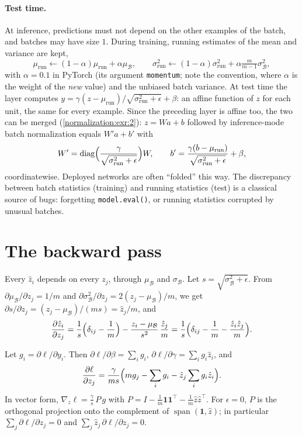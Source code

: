 \begin{notechapter}
\paragraph{Test time.} At inference, predictions must not depend on the other examples of
the batch, and batches may have size $1$. During training, running estimates of the mean and
variance are kept,
\[
  \mu_{\mathrm{run}}\gets(1 - \alpha)\mu_{\mathrm{run}} + \alpha\mu_{\mathcal B},\qquad\sigma^2_{\mathrm{run}}\gets(1 - \alpha)\sigma^2_{\mathrm{run}} + \alpha\tfrac m{m - 1}\sigma^2_{\mathcal B},
\]
with $\alpha = 0.1$ in PyTorch (its argument \texttt{momentum}; note the convention, where $\alpha$ is the
weight of the \emph{new} value) and the unbiased batch variance. At test time the layer computes
$y = \gamma(z - \mu_{\mathrm{run}})/\sqrt{\sigma^2_{\mathrm{run}} + \epsilon} + \beta$: an affine function of $z$ for each unit, the same for every
example. Since the preceding layer is affine too, the two can be merged
(\cref{normalization:exr:2}): $z = Wa + b$ followed by inference-mode batch normalization equals
$W'a + b'$ with
\[
  W' = \operatorname{diag}\Bigl(\frac\gamma{\sqrt{\sigma^2_{\mathrm{run}} + \epsilon}}\Bigr)W,\qquad b' = \frac{\gamma(b - \mu_{\mathrm{run}})}{\sqrt{\sigma^2_{\mathrm{run}} + \epsilon}} + \beta,
\]
coordinatewise. Deployed networks are often ``folded'' this way. The discrepancy between
batch statistics (training) and running statistics (test) is a classical source of bugs:
forgetting \texttt{model.eval()}, or running statistics corrupted by unusual batches.

\section{The backward pass}\label{normalization:sec:backward}

Every $\hat z_i$ depends on every $z_j$, through $\mu_{\mathcal B}$ and $\sigma_{\mathcal B}$. Let $s = \sqrt{\sigma_{\mathcal B}^2 + \epsilon}$. From $\partial\mu_{\mathcal B}/\partial z_j = 1/m$ and
$\partial\sigma_{\mathcal B}^2/\partial z_j = 2(z_j - \mu_{\mathcal B})/m$, we get $\partial s/\partial z_j = (z_j - \mu_{\mathcal B})/(ms) = \hat z_j/m$, and
\[
  \frac{\partial\hat z_i}{\partial z_j} = \frac1s\Bigl(\delta_{ij} - \frac1m\Bigr) - \frac{z_i - \mu_{\mathcal B}}{s^2}\,\frac{\hat z_j}m
  = \frac1s\Bigl(\delta_{ij} - \frac1m - \frac{\hat z_i\hat z_j}m\Bigr) .
\]

\begin{proposition}\label{normalization:prop:backward}
Let $g_i = \partial\ell/\partial y_i$. Then $\partial\ell/\partial\beta = \sum_ig_i$, $\partial\ell/\partial\gamma = \sum_ig_i\hat z_i$, and
\[
  \frac{\partial\ell}{\partial z_j} = \frac\gamma{ms}\Bigl(mg_j - \sum_ig_i - \hat z_j\sum_ig_i\hat z_i\Bigr) .
\]
In vector form, $\nabla_z\ell = \frac\gamma s\,P\,g$ with $P = I - \frac1m\mathbf 1\mathbf 1^\top - \frac1m\hat z\hat z^\top$. For $\epsilon = 0$, $P$ is the orthogonal
projection onto the complement of $\operatorname{span}(\mathbf 1, \hat z)$; in particular $\sum_j\partial\ell/\partial z_j = 0$ and
$\sum_j\hat z_j\,\partial\ell/\partial z_j = 0$.
\end{proposition}


\end{notechapter}
